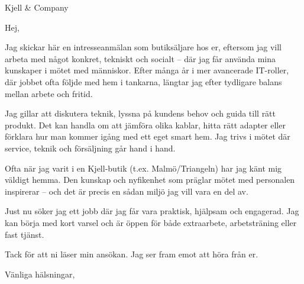 \documentclass[a4paper]{scrlttr2}
\begin{document}
\begin{letter}{Kjell \& Company\\}

\opening{Hej,}

Jag skickar här en intresseanmälan som butiksäljare hos er, eftersom jag vill arbeta med något konkret, tekniskt och socialt – där jag får använda mina kunskaper i mötet med människor. Efter många år i mer avancerade IT-roller, där jobbet ofta följde med hem i tankarna, längtar jag efter tydligare balans mellan arbete och fritid.

Jag gillar att diskutera teknik, lyssna på kundens behov och guida till rätt produkt. Det kan handla om att jämföra olika kablar, hitta rätt adapter eller förklara hur man kommer igång med ett eget smart hem. Jag trivs i mötet där service, teknik och försäljning går hand i hand.

Ofta när jag varit i en Kjell-butik (t.ex. Malmö/Triangeln) har jag känt mig väldigt hemma. Den kunskap och nyfikenhet som präglar mötet med personalen inspirerar – och det är precis en sådan miljö jag vill vara en del av.

Just nu söker jag ett jobb där jag får vara praktisk, hjälpsam och engagerad. Jag kan börja med kort varsel och är öppen för både extraarbete, arbetsträning eller fast tjänst.

Tack för att ni läser min ansökan. Jag ser fram emot att höra från er.

\closing{Vänliga hälsningar,}

\end{letter}
\end{document}
